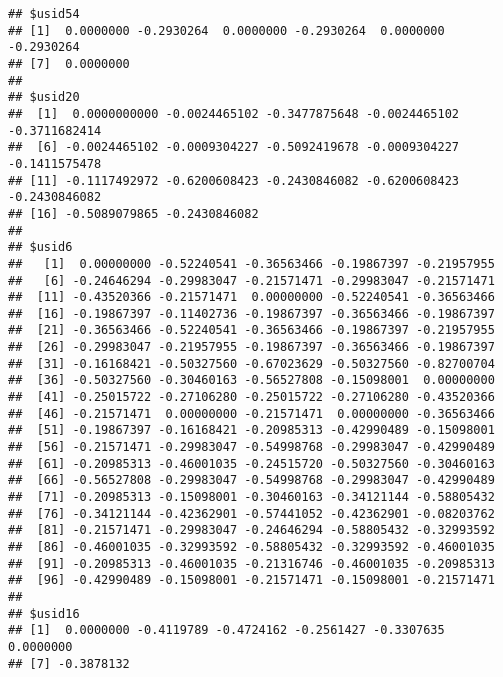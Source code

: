 \documentclass[]{article}
\begin{document}
\begin{verbatim}
## $usid54
## [1]  0.0000000 -0.2930264  0.0000000 -0.2930264  0.0000000 -0.2930264
## [7]  0.0000000
## 
## $usid20
##  [1]  0.0000000000 -0.0024465102 -0.3477875648 -0.0024465102 -0.3711682414
##  [6] -0.0024465102 -0.0009304227 -0.5092419678 -0.0009304227 -0.1411575478
## [11] -0.1117492972 -0.6200608423 -0.2430846082 -0.6200608423 -0.2430846082
## [16] -0.5089079865 -0.2430846082
## 
## $usid6
##   [1]  0.00000000 -0.52240541 -0.36563466 -0.19867397 -0.21957955
##   [6] -0.24646294 -0.29983047 -0.21571471 -0.29983047 -0.21571471
##  [11] -0.43520366 -0.21571471  0.00000000 -0.52240541 -0.36563466
##  [16] -0.19867397 -0.11402736 -0.19867397 -0.36563466 -0.19867397
##  [21] -0.36563466 -0.52240541 -0.36563466 -0.19867397 -0.21957955
##  [26] -0.29983047 -0.21957955 -0.19867397 -0.36563466 -0.19867397
##  [31] -0.16168421 -0.50327560 -0.67023629 -0.50327560 -0.82700704
##  [36] -0.50327560 -0.30460163 -0.56527808 -0.15098001  0.00000000
##  [41] -0.25015722 -0.27106280 -0.25015722 -0.27106280 -0.43520366
##  [46] -0.21571471  0.00000000 -0.21571471  0.00000000 -0.36563466
##  [51] -0.19867397 -0.16168421 -0.20985313 -0.42990489 -0.15098001
##  [56] -0.21571471 -0.29983047 -0.54998768 -0.29983047 -0.42990489
##  [61] -0.20985313 -0.46001035 -0.24515720 -0.50327560 -0.30460163
##  [66] -0.56527808 -0.29983047 -0.54998768 -0.29983047 -0.42990489
##  [71] -0.20985313 -0.15098001 -0.30460163 -0.34121144 -0.58805432
##  [76] -0.34121144 -0.42362901 -0.57441052 -0.42362901 -0.08203762
##  [81] -0.21571471 -0.29983047 -0.24646294 -0.58805432 -0.32993592
##  [86] -0.46001035 -0.32993592 -0.58805432 -0.32993592 -0.46001035
##  [91] -0.20985313 -0.46001035 -0.21316746 -0.46001035 -0.20985313
##  [96] -0.42990489 -0.15098001 -0.21571471 -0.15098001 -0.21571471
## 
## $usid16
## [1]  0.0000000 -0.4119789 -0.4724162 -0.2561427 -0.3307635  0.0000000
## [7] -0.3878132
\end{verbatim}
\end{document}

